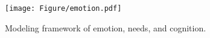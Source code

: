 \begin{figure}[ht]
\centering
\texttt{[image: Figure/emotion.pdf]}
\caption{Modeling framework of emotion, needs, and cognition.}
\label{fig:agents_cognition}
\end{figure}






